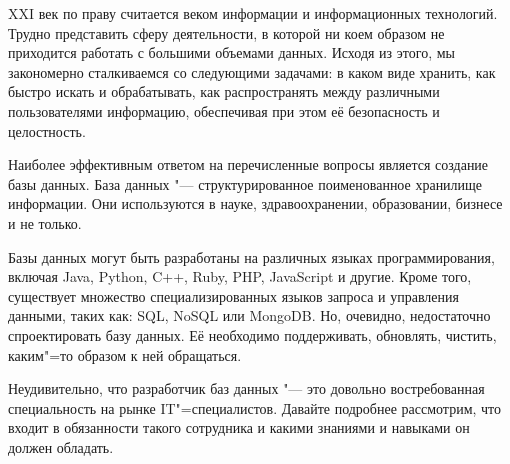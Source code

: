 XXI век по праву считается веком информации и информационных технологий. Трудно
представить сферу деятельности, в которой ни коем образом не приходится работать с
большими объемами данных. Исходя из этого, мы закономерно сталкиваемся со
следующими задачами: в каком виде хранить, как быстро искать и обрабатывать, как
распространять между различными пользователями информацию, обеспечивая при этом
её безопасность и целостность.

Наиболее эффективным ответом на перечисленные вопросы является создание базы
данных. База данных "--- структурированное поименованное хранилище
информации. Они используются в науке, здравоохранении, образовании,
бизнесе и не только.

Базы данных могут быть разработаны на различных языках программирования,
включая Java, Python, C++, Ruby, PHP, JavaScript и другие. Кроме того, 
существует множество специализированных языков запроса и управления данными,
таких как: SQL, NoSQL или MongoDB. Но, очевидно, недостаточно
спроектировать базу данных. Её необходимо поддерживать, обновлять, чистить, каким"=то
образом к ней обращаться.

Неудивительно, что разработчик баз данных "--- это довольно востребованная
специальность на рынке IT"=специалистов. Давайте подробнее рассмотрим, что
входит в обязанности такого сотрудника и какими знаниями и навыками он должен
обладать.